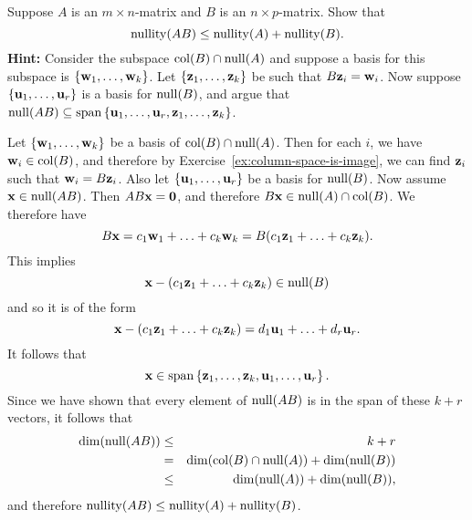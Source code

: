 \begin{ex}
  Suppose $A$ is an $m\times n$-matrix and $B$ is an $n\times p$-matrix.
  Show that
  \begin{equation*}
    \nullity(AB) \leq \nullity(A) + \nullity(B).
  \end{equation*}
  \textbf{Hint:} Consider the subspace $\col(B)\cap\nullspace(A)$ and
  suppose a basis for this subspace is
  $\set{\vect{w}_1,\ldots,\vect{w}_k}$. Let
  $\set{\vect{z}_1,\ldots,\vect{z}_k}$ be such that
  $B\vect{z}_i=\vect{w}_i$. Now suppose
  $\set{\vect{u}_1,\ldots,\vect{u}_r}$ is a basis for
  $\nullspace(B)$, and argue that
  $\nullspace(AB) \subseteq \sspan\set{\vect{u}_1,\ldots,
    \vect{u}_r,\vect{z}_1,\ldots,\vect{z}_k}$.
  \begin{sol}
    Let $\set{\vect{w}_1,\ldots,\vect{w}_k}$ be a basis of
    $\col(B)\cap\nullspace(A)$. Then for each $i$, we have
    $\vect{w}_i\in\col(B)$, and therefore by
    Exercise~\ref{ex:column-space-is-image}, we can find $\vect{z}_i$
    such that $\vect{w}_i = B\vect{z}_i$. Also let
    $\set{\vect{u}_1,\ldots,\vect{u}_r}$ be a basis for
    $\nullspace(B)$. Now assume $\vect{x}\in\nullspace(AB)$. Then
    $AB\vect{x}=\vect{0}$, and therefore
    $B\vect{x} \in \nullspace(A)\cap \col(B)$. We therefore have
    \begin{equation*}
      B\vect{x} = c_1\vect{w}_1+\ldots+c_k\vect{w}_k
      = B(c_1\vect{z}_1+\ldots+c_k\vect{z}_k).
    \end{equation*}
    This implies
    \begin{equation*}
      \vect{x}-(c_1\vect{z}_1+\ldots+c_k\vect{z}_k)\in \nullspace(B)
    \end{equation*}
    and so it is of the form
    \begin{equation*}
      \vect{x}-(c_1\vect{z}_1+\ldots+c_k\vect{z}_k) =
      d_1\vect{u}_1 + \ldots + d_r\vect{u}_r.
    \end{equation*}
    It follows that
    \begin{equation*}
      \vect{x}\in \sspan\set{\vect{z}_1,\ldots,\vect{z}_k,
        \vect{u}_1,\ldots,\vect{u}_r}.
    \end{equation*}
    Since we have shown that every element of $\nullspace(AB)$ is in
    the span of these $k+r$ vectors, it follows that
    \begin{eqnarray*}
      \dim(\nullspace(AB))
      &\leq & k+r \\
      &=& \dim(\col(B)\cap\nullspace(A)) + \dim(\nullspace(B)) \\
      &\leq & \dim(\nullspace(A)) + \dim(\nullspace(B)),
    \end{eqnarray*}
    and therefore $\nullity(AB) \leq \nullity(A) + \nullity(B)$.
  \end{sol}
\end{ex}

